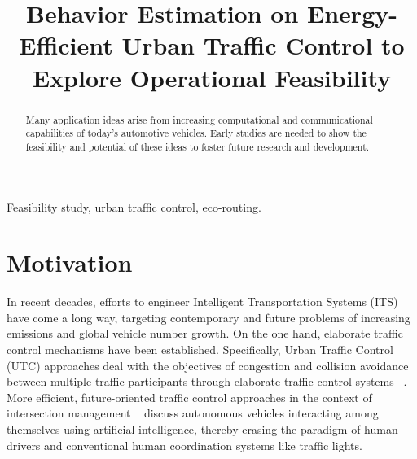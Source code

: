 \documentclass[conference]{../cls/IEEEtran}
\begin{document}
\title{Behavior Estimation on Energy-Efficient Urban Traffic Control to Explore
Operational Feasibility}

\author{
	\and
}

\maketitle

\begin{abstract}
Many application ideas arise from increasing computational and communicational capabilities of today's automotive vehicles.
Early studies are needed to show the feasibility and potential of these ideas to foster future research and development.
\end{abstract}

\begin{IEEEkeywords}
Feasibility study, urban traffic control, eco-routing.
\end{IEEEkeywords}

\section{Motivation}

In recent decades, efforts to engineer Intelligent Transportation Systems (ITS)
have come a long way, targeting contemporary and future problems of increasing
emissions and global vehicle number growth.  On the one hand, elaborate traffic control
mechanisms have been established. Specifically, Urban Traffic Control
(UTC) approaches deal with the objectives of congestion and collision avoidance
between multiple traffic participants through elaborate traffic control systems ~\cite{Chen2010}.
More efficient, future-oriented traffic control approaches in the context of
intersection management ~\cite{Dresner2008} discuss autonomous vehicles interacting among
themselves using artificial intelligence, thereby erasing the paradigm of human drivers and conventional
human coordination systems like traffic lights.
\end{document}

